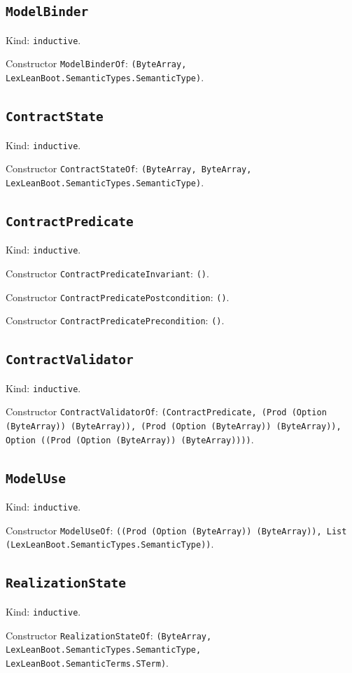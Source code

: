 \documentclass[11pt]{article}
\begin{document}
\subsection*{\texttt{ModelBinder}}
\noindent Kind: \texttt{inductive}.\par
\noindent Constructor \texttt{ModelBinderOf}: \texttt{(ByteArray, LexLeanBoot.SemanticTypes.SemanticType)}.\par
\subsection*{\texttt{ContractState}}
\noindent Kind: \texttt{inductive}.\par
\noindent Constructor \texttt{ContractStateOf}: \texttt{(ByteArray, ByteArray, LexLeanBoot.SemanticTypes.SemanticType)}.\par
\subsection*{\texttt{ContractPredicate}}
\noindent Kind: \texttt{inductive}.\par
\noindent Constructor \texttt{ContractPredicateInvariant}: \texttt{()}.\par
\noindent Constructor \texttt{ContractPredicatePostcondition}: \texttt{()}.\par
\noindent Constructor \texttt{ContractPredicatePrecondition}: \texttt{()}.\par
\subsection*{\texttt{ContractValidator}}
\noindent Kind: \texttt{inductive}.\par
\noindent Constructor \texttt{ContractValidatorOf}: \texttt{(ContractPredicate, (Prod (Option (ByteArray)) (ByteArray)), (Prod (Option (ByteArray)) (ByteArray)), Option ((Prod (Option (ByteArray)) (ByteArray))))}.\par
\subsection*{\texttt{ModelUse}}
\noindent Kind: \texttt{inductive}.\par
\noindent Constructor \texttt{ModelUseOf}: \texttt{((Prod (Option (ByteArray)) (ByteArray)), List (LexLeanBoot.SemanticTypes.SemanticType))}.\par
\subsection*{\texttt{RealizationState}}
\noindent Kind: \texttt{inductive}.\par
\noindent Constructor \texttt{RealizationStateOf}: \texttt{(ByteArray, LexLeanBoot.SemanticTypes.SemanticType, LexLeanBoot.SemanticTerms.STerm)}.\par
\end{document}
